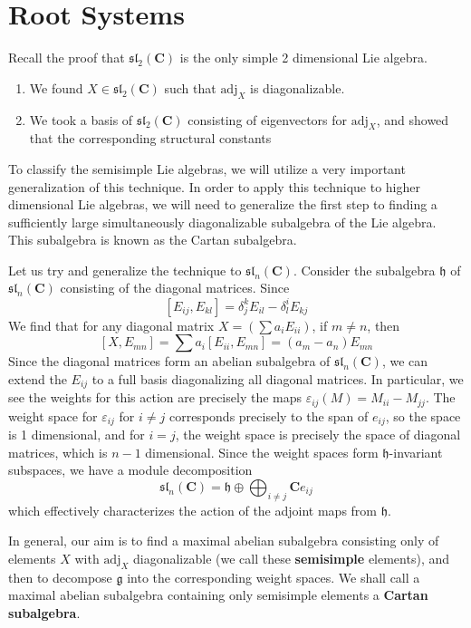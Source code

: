 \chapter{Root Systems}

Recall the proof that $\mathfrak{sl}_2(\mathbf{C})$ is the only simple 2 dimensional Lie algebra.
%
\begin{enumerate}
    \item We found $X \in \mathfrak{sl}_2(\mathbf{C})$ such that $\text{adj}_X$ is diagonalizable.
    \item We took a basis of $\mathfrak{sl}_2(\mathbf{C})$ consisting of eigenvectors for $\text{adj}_X$, and showed that the corresponding structural constants
\end{enumerate}
%
To classify the semisimple Lie algebras, we will utilize a very important generalization of this technique. In order to apply this technique to higher dimensional Lie algebras, we will need to generalize the first step to finding a sufficiently large simultaneously diagonalizable subalgebra of the Lie algebra. This subalgebra is known as the Cartan subalgebra.

Let us try and generalize the technique to $\mathfrak{sl}_n(\mathbf{C})$. Consider the subalgebra $\mathfrak{h}$ of $\mathfrak{sl}_n(\mathbf{C})$ consisting of the diagonal matrices. Since
%
\[ [E_{ij}, E_{kl}] = \delta_j^k E_{il} - \delta_l^i E_{kj} \]
%
We find that for any diagonal matrix $X = (\sum a_i E_{ii})$, if $m \neq n$, then
%
\[ [X,E_{mn}] = \sum a_i [E_{ii}, E_{mn}] = (a_m - a_n) E_{mn} \]
%
Since the diagonal matrices form an abelian subalgebra of $\mathfrak{sl}_n(\mathbf{C})$, we can extend the $E_{ij}$ to a full basis diagonalizing all diagonal matrices. In particular, we see the weights for this action are precisely the maps $\varepsilon_{ij}(M) = M_{ii} - M_{jj}$. The weight space for $\varepsilon_{ij}$ for $i \neq j$ corresponds precisely to the span of $e_{ij}$, so the space is 1 dimensional, and for $i = j$, the weight space is precisely the space of diagonal matrices, which is $n - 1$ dimensional. Since the weight spaces form $\mathfrak{h}$-invariant subspaces, we have a module decomposition
%
\[ \mathfrak{sl}_n(\mathbf{C}) = \mathfrak{h} \oplus \bigoplus_{i \neq j} \mathbf{C} e_{ij} \]
%
which effectively characterizes the action of the adjoint maps from $\mathfrak{h}$.

In general, our aim is to find a maximal abelian subalgebra consisting only of elements $X$ with $\text{adj}_X$ diagonalizable (we call these {\bf semisimple} elements), and then to decompose $\mathfrak{g}$ into the corresponding weight spaces. We shall call a maximal abelian subalgebra containing only semisimple elements a {\bf Cartan subalgebra}.

